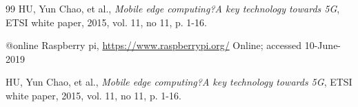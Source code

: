 \clearpage

 \begin{thebibliography}{99}
	 HU, Yun Chao, et al., \emph{Mobile edge computing?A key technology
		towards 5G}, ETSI white paper, 2015, vol. 11, no 11, p. 1-16.
	
	
	@online{ Raspberry pi,
		\url{https://www.raspberrypi.org/}
		Online; accessed 10-June-2019
	}
	
	 HU, Yun Chao, et al., \emph{Mobile edge computing?A key technology
		towards 5G}, ETSI white paper, 2015, vol. 11, no 11, p. 1-16.		
\end{thebibliography}
